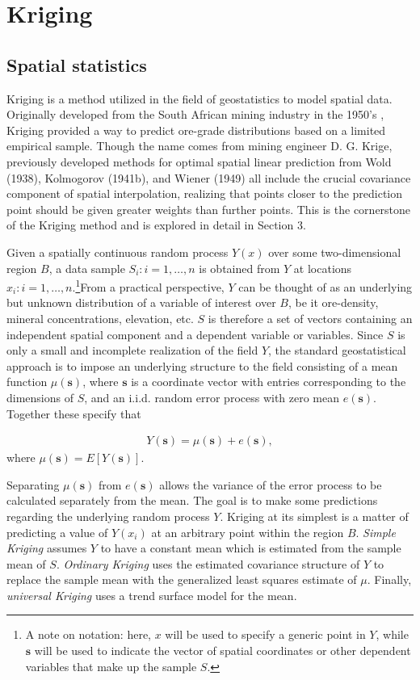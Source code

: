 \documentclass[12pt,twoside]{reedthesis}
\begin{document}
    \chapter{Kriging}
    	\section{Spatial statistics}
Kriging is a method utilized in the field of geostatistics to model spatial data. Originally developed from the South African mining industry in the 1950's \cite{cressie:1993}, Kriging provided a way to predict ore-grade distributions based on a limited empirical sample. Though the name comes from mining engineer D. G. Krige, previously developed methods for optimal spatial linear prediction from Wold (1938), Kolmogorov (1941b), and Wiener (1949) all include the crucial covariance component of spatial interpolation, realizing that points closer to the prediction point should be given greater weights than further points. This is the cornerstone of the Kriging method and is explored in detail in Section 3. 

Given a spatially continuous random process $Y(x)$ over some two-dimensional region $B$, a data sample $S_i: i=1, \dots, n$ is obtained from $Y$ at locations $x_i: i=1, \dots, n$.\footnote{A note on notation: here, $x$ will be used to specify a generic point in $Y$, while $\mathbf{s}$ will be used to indicate the vector of spatial coordinates or other dependent variables that make up the sample $S$.}From a practical perspective, $Y$ can be thought of as an underlying but unknown distribution of a variable of interest over $B$, be it ore-density, mineral concentrations, elevation, etc. $S$ is therefore a set of vectors containing an independent spatial component and a dependent variable or variables. Since $S$ is only a small and incomplete realization of the field $Y$, the standard geostatistical approach is to impose an underlying structure to the field consisting of a mean function $\mu(\mathbf{s})$, where $\mathbf{s}$ is a coordinate vector with entries corresponding to the dimensions of $S$, and an i.i.d. random error process with zero mean $e(\mathbf{s})$. Together these specify that

\begin{align*}
Y(\mathbf{s}) = \mu(\mathbf{s}) + e(\mathbf{s}),
\end{align*} 
where $\mu(\mathbf{s}) = E[Y(\mathbf{s})]$.
  

Separating $\mu(\mathbf{s})$ from $e(\mathbf{s})$ allows the variance of the error process to be calculated separately from the mean. The goal is to make some predictions regarding the underlying random process $Y$. Kriging at its simplest is a matter of predicting a value of $Y(x_i)$ at an arbitrary point within the region $B$. \emph{Simple Kriging} assumes $Y$ to have a constant mean which is estimated from the sample mean of $S$. \emph{Ordinary Kriging} uses the estimated covariance structure of $Y$ to replace the sample mean with the generalized least squares estimate of $\mu$. Finally, \emph{universal Kriging} uses a trend surface model for the mean. 
\end{document}
